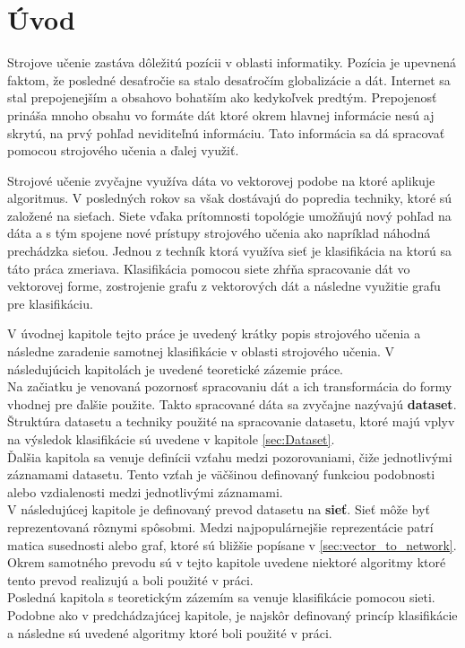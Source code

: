 \documentclass[slovak,master,dept460,male,cpp,cpdeclaration]{diploma}
\begin{document}
\MakeTitlePages

\section{Úvod}
\label{sec:Introduction}
Strojove učenie zastáva dôležitú pozícii v oblasti informatiky. Pozícia je upevnená faktom, že posledné desaťročie sa stalo desaťročím globalizácie a dát. Internet sa stal prepojenejším a obsahovo bohatším ako kedykoľvek predtým. Prepojenosť prináša mnoho obsahu vo formáte dát ktoré okrem hlavnej informácie nesú aj skrytú, na prvý pohľad neviditeľnú informáciu. Tato informácia sa dá spracovať pomocou strojového učenia a ďalej využiť.

Strojové učenie zvyčajne využíva dáta vo vektorovej podobe na ktoré aplikuje algoritmus. V posledných rokov sa však dostávajú do popredia techniky, ktoré sú založené na sieťach. Siete vďaka prítomnosti topológie umožňujú nový pohľad na dáta a s tým spojene nové prístupy strojového učenia ako napríklad náhodná prechádzka sieťou. Jednou z techník ktorá využíva sieť je klasifikácia na ktorú sa táto práca zmeriava. Klasifikácia pomocou siete zhŕňa spracovanie dát vo vektorovej forme, zostrojenie grafu z vektorových dát a následne využitie grafu pre klasifikáciu.

V úvodnej kapitole tejto práce je uvedený krátky popis strojového učenia a následne zaradenie samotnej klasifikácie v oblasti strojového učenia. V následujúcich kapitolách je uvedené teoretické zázemie práce.\\
Na začiatku je venovaná pozornosť spracovaniu dát a ich transformácia do formy vhodnej pre ďalšie použite. Takto spracované dáta sa zvyčajne nazývajú \textbf{dataset}. Štruktúra datasetu a techniky použité na spracovanie datasetu, ktoré majú vplyv na výsledok klasifikácie sú uvedene v kapitole \ref{sec:Dataset}. \\
Ďalšia kapitola sa venuje definícii vzťahu medzi pozorovaniami, čiže jednotlivými záznamami datasetu. Tento vzťah je väčšinou definovaný funkciou podobnosti alebo vzdialenosti medzi jednotlivými záznamami.\\
V následujúcej kapitole je definovaný prevod datasetu na \textbf{sieť}. Sieť môže byť reprezentovaná rôznymi spôsobmi. Medzi najpopulárnejšie reprezentácie patrí matica susednosti alebo graf, ktoré sú bližšie popísane v \ref{sec:vector_to_network}. Okrem samotného prevodu sú v tejto kapitole uvedene niektoré algoritmy ktoré tento prevod realizujú a boli použité v práci.\\
Posledná kapitola s teoretickým zázemím sa venuje klasifikácie pomocou sieti. Podobne ako v predchádzajúcej kapitole, je najskôr definovaný princíp klasifikácie a následne sú uvedené algoritmy ktoré boli použité v práci.
\end{document}

